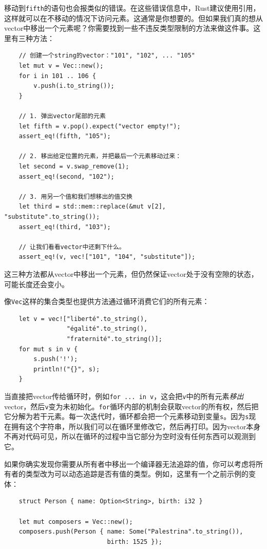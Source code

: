 移动到\texttt{fifth}的语句也会报类似的错误。在这些错误信息中，Rust建议使用引用，这样就可以在不移动的情况下访问元素。这通常是你想要的。但如果我们真的想从vector中移出一个元素呢？你需要找到一些不违反类型限制的方法来做这件事。这里有三种方法：
\begin{verbatim}
    // 创建一个string的vector："101", "102", ... "105"
    let mut v = Vec::new();
    for i in 101 .. 106 {
        v.push(i.to_string());
    }

    // 1. 弹出vector尾部的元素
    let fifth = v.pop().expect("vector empty!");
    assert_eq!(fifth, "105");

    // 2. 移出给定位置的元素，并把最后一个元素移动过来：
    let second = v.swap_remove(1);
    assert_eq!(second, "102");

    // 3. 用另一个值和我们想移出的值交换
    let third = std::mem::replace(&mut v[2], "substitute".to_string());
    assert_eq!(third, "103");

    // 让我们看看vector中还剩下什么。
    assert_eq!(v, vec!["101", "104", "substitute"]);
\end{verbatim}

这三种方法都从vector中移出一个元素，但仍然保证vector处于没有空隙的状态，可能长度还会变小。

像\texttt{Vec}这样的集合类型也提供方法通过循环消费它们的所有元素：
\begin{verbatim}
    let v = vec!["liberté".to_string(),
                 "égalité".to_string(),
                 "fraternité".to_string()];
    for mut s in v {
        s.push('!');
        println!("{}", s);
    }
\end{verbatim}

当直接把vector传给循环时，例如\texttt{for ... in v}，这会把\texttt{v}中的所有元素\emph{移出}vector，然后\texttt{v}变为未初始化。\texttt{for}循环内部的机制会获取vector的所有权，然后把它分解为若干元素。每一次迭代时，循环都会把一个元素移动到变量\texttt{s}。因为\texttt{s}现在拥有这个字符串，所以我们可以在循环里修改它，然后再打印。因为vector本身不再对代码可见，所以在循环的过程中当它部分为空时没有任何东西可以观测到它。

如果你确实发现你需要从所有者中移出一个编译器无法追踪的值，你可以考虑将所有者的类型改为可以动态追踪是否有值的类型。例如，这里有一个之前示例的变体：
\begin{verbatim}
    struct Person { name: Option<String>, birth: i32 }

    let mut composers = Vec::new();
    composers.push(Person { name: Some("Palestrina".to_string()),
                            birth: 1525 });
\end{verbatim}

